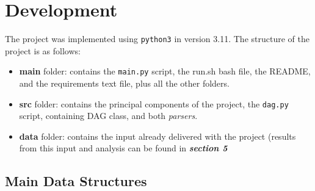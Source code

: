 \documentclass[11pt]{article}
\begin{document}
\section{Development}
The project was implemented using \texttt{python3} in version 3.11. The structure of the project is as follows:
    \begin{itemize}
        \item \textbf{main} folder: contains the \texttt{main.py} script, the run.sh bash file, the README, and the requirements text file, plus all the other folders.
        \item \textbf{src} folder: contains the principal components of the project, the \texttt{dag.py} script, containing DAG class, and both \textit{parsers}.
        \item \textbf{data} folder: contains the input already delivered with the project (results from this input and analysis can be found in \textbf{\textit{section 5}}
    \end{itemize}

\subsection{Main Data Structures}
\end{document}
